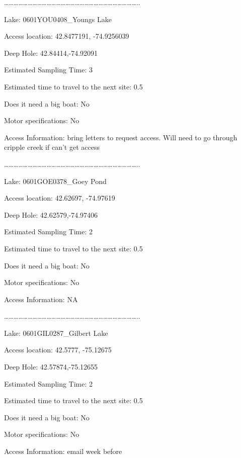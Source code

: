 \documentclass[]{article}
\begin{document}
\ldots{}\ldots{}\ldots{}\ldots{}\ldots{}\ldots{}\ldots{}\ldots{}\ldots{}\ldots{}\ldots{}\ldots{}\ldots{}\ldots{}\ldots{}\ldots{}\ldots{}\ldots{}\ldots{}\ldots{}\ldots{}\ldots{}\ldots{}\ldots{}\ldots{}\ldots{}\ldots{}\ldots{}..

Lake: 0601YOU0408\_Youngs Lake

Access location: 42.8477191, -74.9256039

Deep Hole: 42.84414,-74.92091

Estimated Sampling Time: 3

Estimated time to travel to the next site: 0.5

Does it need a big boat: No

Motor specifications: No

Access Information: bring letters to request access. Will need to go
through cripple creek if can't get access

\ldots{}\ldots{}\ldots{}\ldots{}\ldots{}\ldots{}\ldots{}\ldots{}\ldots{}\ldots{}\ldots{}\ldots{}\ldots{}\ldots{}\ldots{}\ldots{}\ldots{}\ldots{}\ldots{}\ldots{}\ldots{}\ldots{}\ldots{}\ldots{}\ldots{}\ldots{}\ldots{}\ldots{}..

Lake: 0601GOE0378\_Goey Pond

Access location: 42.62697, -74.97619

Deep Hole: 42.62579,-74.97406

Estimated Sampling Time: 2

Estimated time to travel to the next site: 0.5

Does it need a big boat: No

Motor specifications: No

Access Information: NA

\ldots{}\ldots{}\ldots{}\ldots{}\ldots{}\ldots{}\ldots{}\ldots{}\ldots{}\ldots{}\ldots{}\ldots{}\ldots{}\ldots{}\ldots{}\ldots{}\ldots{}\ldots{}\ldots{}\ldots{}\ldots{}\ldots{}\ldots{}\ldots{}\ldots{}\ldots{}\ldots{}\ldots{}..

Lake: 0601GIL0287\_Gilbert Lake

Access location: 42.5777, -75.12675

Deep Hole: 42.57874,-75.12655

Estimated Sampling Time: 2

Estimated time to travel to the next site: 0.5

Does it need a big boat: No

Motor specifications: No

Access Information: email week before
\end{document}
